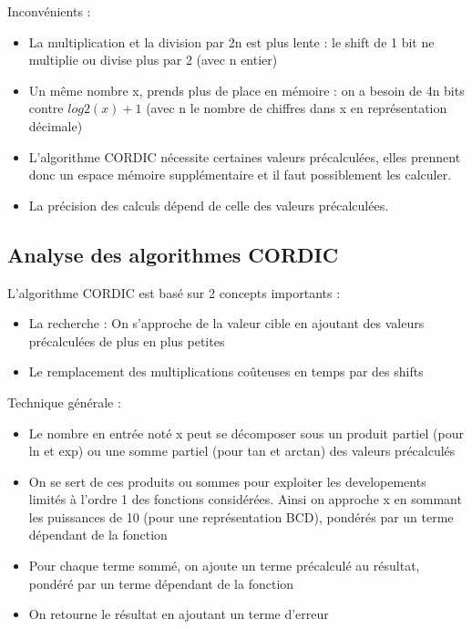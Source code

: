 \documentclass{article}
\begin{document}
\vspace{1em}

Inconvénients :
\begin{itemize}
    \item La multiplication et la division par 2n est plus lente : le shift de 1 bit ne multiplie ou divise plus par 2 (avec n entier)
    \item Un même nombre x, prends plus de place en mémoire : on a besoin de 4n bits contre $log2(x) +1$ (avec n le nombre de chiffres dans x en représentation décimale)
    \item L'algorithme CORDIC nécessite certaines valeurs précalculées, elles prennent donc un espace mémoire supplémentaire et il faut possiblement les calculer.
    \item La précision des calculs dépend de celle des valeurs précalculées.
\end{itemize}

\subsection*{Analyse des algorithmes CORDIC}

L'algorithme CORDIC est basé sur 2 concepts importants :
\begin{itemize}
    \item La recherche : On s'approche de la valeur cible en ajoutant des valeurs précalculées de plus en plus petites
    \item Le remplacement des multiplications coûteuses en temps par des shifts
\end{itemize}

\vspace{1em}

Technique générale :
\begin{itemize}
    \item Le nombre en entrée noté x peut se décomposer sous un produit partiel (pour ln et exp) ou une somme partiel (pour tan et arctan) des valeurs précalculés
    \item On se sert de ces produits ou sommes pour exploiter les developements  limités à l'ordre 1 des fonctions considérées. Ainsi on approche x en sommant les puissances de 10 (pour une représentation BCD), pondérés par un terme dépendant de la fonction
    \item Pour chaque terme sommé, on ajoute un terme précalculé au résultat, pondéré par un terme dépendant de la fonction
    \item On retourne le résultat en ajoutant un terme d'erreur
\end{itemize}
\end{document}
